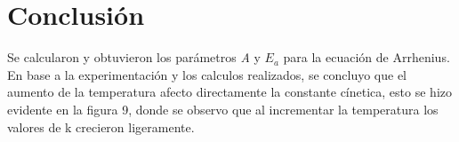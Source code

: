 \section{Conclusión}

Se calcularon y obtuvieron los parámetros \textit{A} y \textit{$E_{a}$} para la
 ecuación de Arrhenius. En base a la experimentación y los calculos realizados, 
 se concluyo que el aumento de la temperatura afecto directamente la constante 
 cínetica, esto se hizo evidente en la figura 9, donde se observo que al incrementar
  la temperatura los valores de k crecieron ligeramente. 
